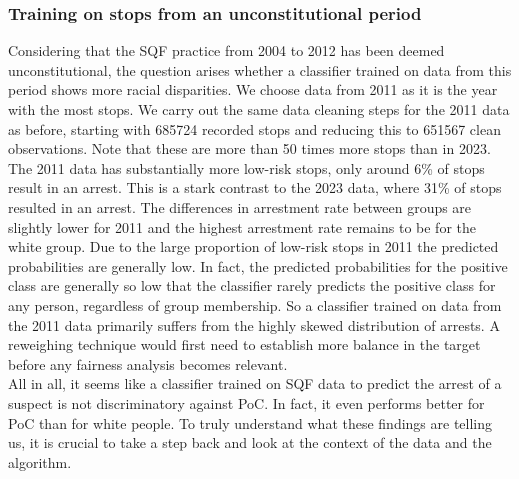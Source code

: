 \subsubsection*{Training on stops from an unconstitutional period}
Considering that the SQF practice from 2004 to 2012 has been deemed unconstitutional, the question arises whether a classifier trained on data from this period shows more racial disparities.
We choose data from 2011 as it is the year with the most stops.
We carry out the same data cleaning steps for the 2011 data as before, starting with 685724 recorded stops and reducing this to 651567 clean observations. Note that these are more than 50 times more stops than in 2023.
The 2011 data has substantially more low-risk stops, only around 6\% of stops result in an arrest. This is a stark contrast to the 2023 data, where 31\% of stops resulted in an arrest.
The differences in arrestment rate between groups are slightly lower for 2011 and the highest arrestment rate remains to be for the white group.
Due to the large proportion of low-risk stops in 2011 the predicted probabilities are generally low. In fact, the predicted probabilities for the positive class are generally so low that the classifier rarely predicts the positive class for any person, regardless of group membership.
So a classifier trained on data from the 2011 data primarily suffers from the highly skewed distribution of arrests. A reweighing technique would first need to establish more balance in the target before any fairness analysis becomes relevant.\\ 

All in all, it seems like a classifier trained on SQF data to predict the arrest of a suspect is not discriminatory against PoC. In fact, it even performs better for PoC than for white people.
To truly understand what these findings are telling us, it is crucial to take a step back and look at the context of the data and the algorithm.






